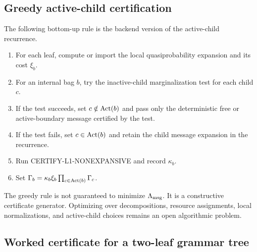 \begin{center}
\end{center}

\subsection{Greedy active-child certification}

The following bottom-up rule is the backend version of the active-child recurrence.
\begin{enumerate}[leftmargin=1.2cm]
\item For each leaf, compute or import the local quasiprobability expansion and its cost \(\xi_b\).
\item For an internal bag \(b\), try the inactive-child marginalization test for each child \(c\).
\item If the test succeeds, set \(c\notin\operatorname{Act}(b)\) and pass only the deterministic free or active-boundary message certified by the test.
\item If the test fails, set \(c\in\operatorname{Act}(b)\) and retain the child message expansion in the recurrence.
\item Run CERTIFY-L1-NONEXPANSIVE and record \(\kappa_b\).
\item Set \(\Gamma_b=\kappa_b\xi_b\prod_{c\in\operatorname{Act}(b)}\Gamma_c\).
\end{enumerate}
The greedy rule is not guaranteed to minimize \(\Lambda_{\mathrm{msg}}\). It is a constructive certificate generator. Optimizing over decompositions, resource assignments, local normalizations, and active-child choices remains an open algorithmic problem.

\subsection{Worked certificate for a two-leaf grammar tree}
\label{app:worked-certificate}


